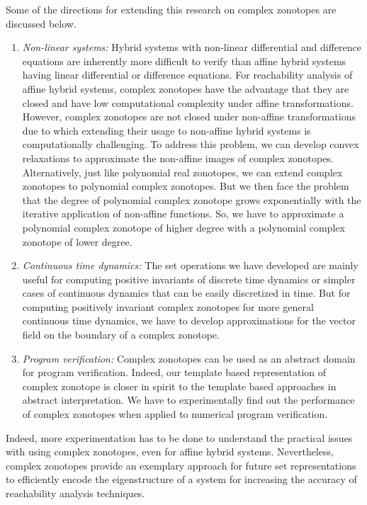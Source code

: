 Some of the directions for extending this research on complex
zonotopes are discussed below.
%
\begin{enumerate}
\item \emph{Non-linear systems: } Hybrid systems with non-linear
  differential and difference equations are inherently more difficult
  to verify than affine hybrid systems having linear differential or
  difference equations.  For reachability analysis of affine hybrid
  systems, complex zonotopes have the advantage that they are closed
  and have low computational complexity under affine transformations.
  However, complex zonotopes are not closed under non-affine
  transformations due to which extending their usage to non-affine
  hybrid systems is computationally challenging.  To address this
  problem, we can develop convex relaxations to approximate the
  non-affine images of complex zonotopes.  Alternatively, just like
  polynomial real zonotopes, we can extend complex zonotopes to
  polynomial complex zonotopes.  But we then face the problem that the
  degree of polynomial complex zonotope grows exponentially with the
  iterative application of non-affine functions.  So, we have to
  approximate a polynomial complex zonotope of higher degree with a
  polynomial complex zonotope of lower degree.
\item \emph{Continuous time dynamics: } The set operations we have
  developed are mainly useful for computing positive invariants of
  discrete time dynamics or simpler cases of continuous dynamics that
  can be easily discretized in time.  But for computing positively
  invariant complex zonotopes for more general continuous time
  dynamics, we have to develop approximations for the vector field
  on the boundary of a complex zonotope.
\item \emph{Program verification:  }  Complex zonotopes can be used as
  an abstract domain for program verification.  Indeed, our template
  based representation of complex zonotope is closer in spirit to the
  template based approaches in abstract interpretation.  We have to
  experimentally find out the performance of complex zonotopes when
  applied to numerical program verification.
\end{enumerate}
%
Indeed, more experimentation has to be done to understand the
practical issues with using complex zonotopes, even for affine hybrid
systems.  Nevertheless, complex zonotopes provide an exemplary
approach for future set representations to efficiently encode the
eigenstructure of a system for increasing the accuracy of reachability
analysis techniques.
